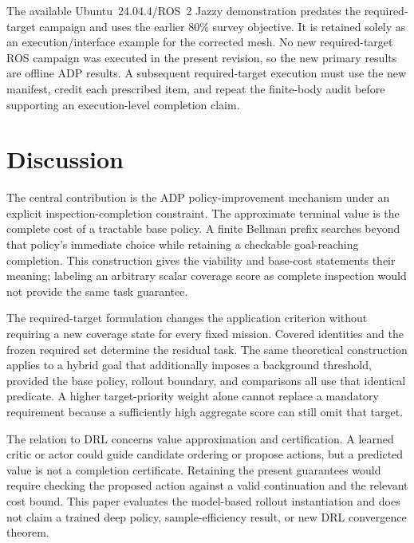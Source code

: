 The available Ubuntu~24.04.4/ROS~2 Jazzy demonstration predates the required-target campaign and uses the earlier 80\% survey objective. It is retained solely as an execution/interface example for the corrected mesh. No new required-target ROS campaign was executed in the present revision, so the new primary results are offline ADP results. A subsequent required-target execution must use the new manifest, credit each prescribed item, and repeat the finite-body audit before supporting an execution-level completion claim.

\ifincludeROSVerificationResults
  
\fi

\section{Discussion}
\label{sec:discussion}

The central contribution is the ADP policy-improvement mechanism under an explicit inspection-completion constraint. The approximate terminal value is the complete cost of a tractable base policy. A finite Bellman prefix searches beyond that policy's immediate choice while retaining a checkable goal-reaching completion. This construction gives the viability and base-cost statements their meaning; labeling an arbitrary scalar coverage score as complete inspection would not provide the same task guarantee.

The required-target formulation changes the application criterion without requiring a new coverage state for every fixed mission. Covered identities and the frozen required set determine the residual task. The same theoretical construction applies to a hybrid goal that additionally imposes a background threshold, provided the base policy, rollout boundary, and comparisons all use that identical predicate. A higher target-priority weight alone cannot replace a mandatory requirement because a sufficiently high aggregate score can still omit that target.

The relation to DRL concerns value approximation and certification. A learned critic or actor could guide candidate ordering or propose actions, but a predicted value is not a completion certificate. Retaining the present guarantees would require checking the proposed action against a valid continuation and the relevant cost bound. This paper evaluates the model-based rollout instantiation and does not claim a trained deep policy, sample-efficiency result, or new DRL convergence theorem.

